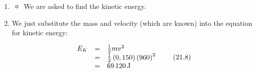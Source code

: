 {\begin{mdframed}[linewidth=4, leftmargin=40, rightmargin=40]
\begin{exercise}
\begin{enumerate}[noitemsep, label=\textbf{Step} \textbf{\arabic*}. ]
\begin{itemize}[noitemsep]
\begin{equation}
      \end{equation}
    \label{m38785*uid67}\item We are given the initial velocity with which the bullet leaves the barrel, called the muzzle velocity, and it is $v=960\phantom{\rule{2pt}{0ex}}\mathrm{m}\ensuremath{\cdot}\mathrm{s}{}^{-1}$.
\end{itemize}
        \item  
        \label{m38785*id67963}\begin{itemize}[noitemsep]
            \leftskip=20pt\rightskip=\leftskip\label{m38785*uid68}\item We are asked to find the kinetic energy.
\end{itemize}
        \item  
        \label{m38785*id67983}We just substitute the mass and velocity (which are known) into the equation for kinetic energy:\par 
        \label{m38785*id67987}\nopagebreak\noindent{}
    \begin{equation}
    \begin{array}{ccc}\hfill {E}_{K}& =& \frac{1}{2}m{v}^{2}\hfill \\ & =& \frac{1}{2}\left(0,150\right){\left(960\right)}^{2}\hfill \\ & =& 69\phantom{\rule{0.166667em}{0ex}}120\phantom{\rule{0.166667em}{0ex}}\mathrm{J}\hfill \end{array}\tag{21.8}
      \end{equation}
        \end{enumerate}
    \end{exercise}
    \end{mdframed}
    }
    \noindent
\label{m38785*secfhsst!!!underscore!!!id1491}
